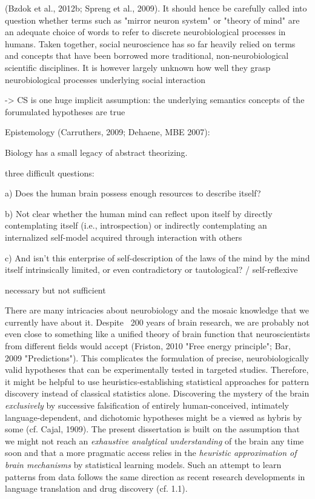 \documentclass[authoryear,review,3p]{elsarticle}
\begin{document}
(Bzdok et al., 2012b; Spreng et al., 2009). It should hence be carefully called into question whether terms such as "mirror neuron system" or "theory of mind" are an adequate choice of words to refer to discrete neurobiological processes in humans. Taken together, social neuroscience has so far heavily relied on terms and concepts that have been borrowed more traditional, non-neurobiological scientific disciplines. It is however largely unknown how well they grasp neurobiological processes underlying social interaction

-> CS is one huge implicit assumption:
the underlying semantics concepts of the forumulated hypotheses are true






Epistemology (Carruthers, 2009; Dehaene, MBE 2007):

Biology has a small legacy of abstract theorizing.

three difficult questions:

a) Does the human brain possess enough resources to describe itself?

b) Not clear whether the human mind can reflect upon itself
by directly contemplating itself (i.e., introspection) or
indirectly contemplating an internalized self-model acquired through
interaction with others

c) And isn’t this enterprise of self-description of the laws of the mind by the mind itself intrinsically limited, or even contradictory or tautological? / self-reflexive


necessary but not sufficient


There are many intricacies about neurobiology and 
the mosaic knowledge that we currently have about it.
%
Despite ~200 years of brain research,
we are probably not even close to something like a unified theory of
brain function
that neuroscientists from different fields would accept
(Friston, 2010 "Free energy principle"; Bar, 2009 "Predictions").
This complicates the formulation of precise, neurobiologically
valid hypotheses that can be experimentally tested in targeted studies.
%
Therefore, it might be helpful to use heuristics-establishing
statistical approaches for pattern discovery instead of
classical statistics alone.
%
Discovering the mystery of the brain \textit{exclusively} by
successive falsification of
entirely human-conceived,
intimately language-dependent,
and dichotomic hypotheses
might be a viewed as hybris by some (cf. Cajal, 1909).
%
The present dissertation is built on the assumption that
we might not reach an \textit{exhaustive analytical understanding}
of the brain any time soon
and that a more pragmatic access relies in the \textit{heuristic
approximation of brain mechanisms} by statistical learning models.
%
Such an attempt to learn patterns from data follows the same
direction as recent research developments in
language translation and drug discovery (cf. 1.1).
\end{document}
